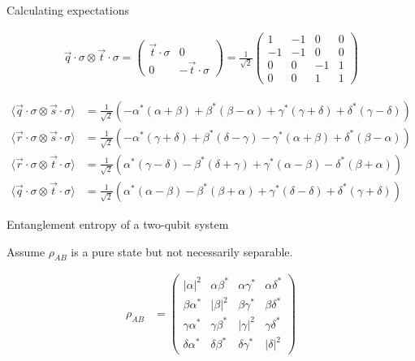 \documentclass[aspectratio=1610]{beamer}					%
\begin{document}
\begin{frame}{Calculating expectations}


\begin{align*}
\vec{q}\cdot\sigma\otimes\vec{t}\cdot\sigma = 
\begin{pmatrix}
\vec{t}\cdot\sigma & 0\\
0 & -\vec{t}\cdot\sigma
\end{pmatrix} = 
\frac{1}{\sqrt{2}}\begin{pmatrix}
1 & -1 & 0 & 0\\
-1 & -1 & 0 & 0\\
0 & 0 & -1 & 1 \\
0 & 0 & 1 & 1
\end{pmatrix}
\end{align*}


\begin{align*}
\langle \vec{q}\cdot\sigma\otimes\vec{s}\cdot\sigma\rangle &= \frac{1}{\sqrt{2}}\left(-\alpha^{*}(\alpha+\beta) + \beta^{*}(\beta-\alpha) + \gamma^{*}(\gamma+\delta) + \delta^{*}(\gamma-\delta)\right)\\
\langle \vec{r}\cdot\sigma\otimes\vec{s}\cdot\sigma\rangle &= \frac{1}{\sqrt{2}}\left(-\alpha^{*}(\gamma+\delta) + \beta^{*}(\delta-\gamma) - \gamma^{*}(\alpha + \beta) + \delta^{*}(\beta-\alpha)\right)\\
\langle \vec{r}\cdot\sigma\otimes\vec{t}\cdot\sigma\rangle &= \frac{1}{\sqrt{2}}\left(\alpha^{*}(\gamma-\delta) - \beta^{*}(\delta+\gamma) + \gamma^{*}(\alpha - \beta) - \delta^{*}(\beta+\alpha)\right)\\
\langle \vec{q}\cdot\sigma\otimes\vec{t}\cdot\sigma\rangle &= \frac{1}{\sqrt{2}}\left(\alpha^{*}(\alpha-\beta) - \beta^{*}(\beta+\alpha) + \gamma^{*}(\delta-\delta) + \delta^{*}(\gamma+\delta)\right)
\end{align*}


\end{frame}

\begin{frame}{Entanglement entropy of a two-qubit system}

Assume $\rho_{AB}$ is a pure state but not necessarily separable.

\begin{align*}
\rho_{AB} &=\begin{pmatrix}
|\alpha|^{2} & \alpha\beta^{*} & \alpha\gamma^{*} & \alpha\delta^{*} \\
\beta\alpha^{*} & |\beta|^{2} & \beta\gamma^{*} & \beta\delta^{*} \\
\gamma\alpha^{*} & \gamma\beta^{*} & |\gamma|^{2} & \gamma\delta^{*} \\
\delta\alpha^{*} & \delta\beta^{*} & \delta\gamma^{*} & |\delta|^{2}
\end{pmatrix}
\end{align*}



\end{frame}
\end{document}

